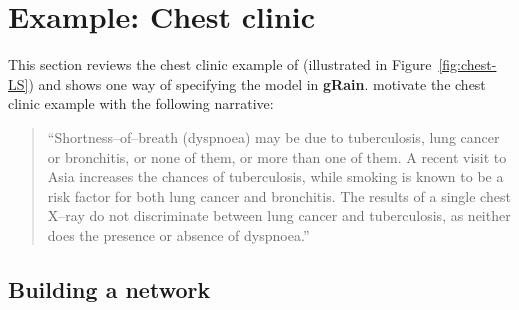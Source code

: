 \documentclass[10pt]{article}\usepackage[]{graphicx}\usepackage[]{xcolor}
\makeatletter
\newenvironment{kframe}{%
 \def\at@end@of@kframe{}%
 \ifinner\ifhmode%
  \def\at@end@of@kframe{\end{minipage}}%
  \begin{minipage}{\columnwidth}%
 \fi\fi%
 \def\FrameCommand##1{\hskip\@totalleftmargin \hskip-\fboxsep
 \colorbox{shadecolor}{##1}\hskip-\fboxsep
     \hskip-\linewidth \hskip-\@totalleftmargin \hskip\columnwidth}%
 \MakeFramed {\advance\hsize-\width
   \@totalleftmargin\z@ \linewidth\hsize
   \@setminipage}}%
 {\par\unskip\endMakeFramed%
 \at@end@of@kframe}
\newenvironment{knitrout}{}{} %
\def\grbn{{\bf gRain}}
\makeatother
\begin{document}
\section{Example: Chest clinic}
\label{sec:chest-clinic}
\label{sec:chest}





This section reviews the chest clinic example of \cite{lau/spieg:88}
(illustrated in Figure~\ref{fig:chest-LS}) and shows one way of
specifying the model in \grbn{}.  \cite{lau/spieg:88} motivate the
chest clinic example with the following narrative:

\begin{quote}
  ``Shortness--of--breath (dyspnoea) may be due to tuberculosis, lung
  cancer or bronchitis, or none of them, or more than one of them. A
  recent visit to Asia increases the chances of tuberculosis, while
  smoking is known to be a risk factor for both lung cancer and
  bronchitis. The results of a single chest X--ray do not discriminate
  between lung cancer and tuberculosis, as neither does the presence or
  absence of dyspnoea.''
\end{quote}



\begin{knitrout}
\color{fgcolor}\begin{kframe}


{\ttfamily\noindent\bfseries\color{errorcolor}{\#\# Error in xy.coords(x, y, xlabel, ylabel, log): 'x' is a list, but does not have components 'x' and 'y'}}\end{kframe}
\end{knitrout}

\subsection{Building a network}
\end{document}
